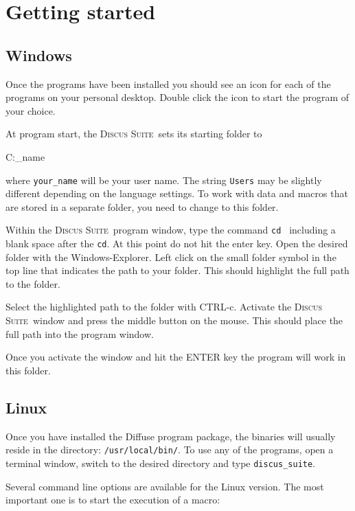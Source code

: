 \documentclass[11pt]{report}
\newcommand{\Suite}{\textsc{Discus Suite\ }}
\begin{document}
\section{Getting started} \label{start}

\subsection{Windows} \label{start-win}

Once the programs have been installed you should see an icon for each of 
the programs on your personal desktop. Double click the icon to start
the program of your choice.

At program start, the \Suite sets its starting folder to\\
\begin{MacVerbatim}
   C:\Users\your_name
\end{MacVerbatim}
where {\tt your\_name} will be your user name. The string {\tt Users}
may be slightly different depending on the language settings.
To work with data and macros that are stored in a separate folder, 
you need to change to this folder.

Within the \Suite program window, type the command {\tt cd } including a
blank space after the {\tt cd}. At this point do not hit the enter key.
Open the desired folder with the Windows-Explorer. Left click on the 
small folder symbol in the top line that indicates the path to your
folder. This should highlight the full path to the folder. 

Select the highlighted path to the folder
with CTRL-c. Activate the \Suite window and press the 
middle button on the mouse. This should place the full path into the
program window. 

Once you activate the window and hit the ENTER key the program will 
work in this folder.

\subsection{Linux} \label{start-linux}

Once you have installed the Diffuse program package, the binaries will
usually reside in the directory: {\tt /usr/local/bin/}. 
To use any of the programs, open a terminal window, switch to the 
desired directory and type {\tt discus\_suite}.

Several command line options are available for the Linux version.
The most important one is to start the execution of a macro:
\end{document}
